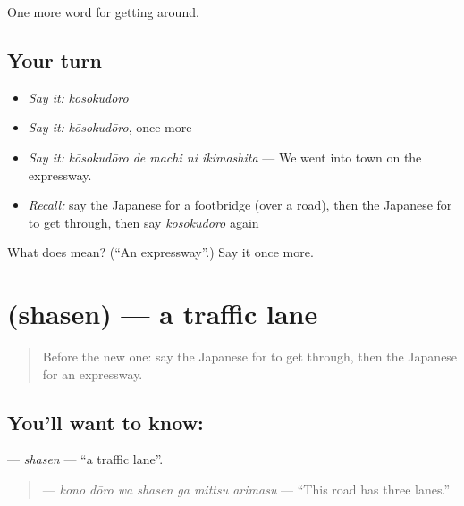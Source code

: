 \begin{grammarlens}[title={What you've built}]
One more word for getting around.
\end{grammarlens}

\subsection*{Your turn}
\begin{itemize}
\raggedright
  \item \emph{Say it:} \emph{kōsokudōro}
  \item \emph{Say it:} \emph{kōsokudōro}, once more
  \item \emph{Say it:} \emph{kōsokudōro de machi ni ikimashita} — We went into town on the expressway.
  \item \emph{Recall:} say the Japanese for a footbridge (over a road), then the Japanese for to get through, then say \emph{kōsokudōro} again
\end{itemize}

\begin{tcolorbox}[breakable,colback=teal!4,colframe=teal!35!black,title={Before you move on}]
What does  mean? (\textquotedblleft{}An expressway\textquotedblright{}.) Say it once more.
\end{tcolorbox}
\section[\texorpdfstring{\ja{しゃせん} (shasen)}{しゃせん (shasen)}]{ (shasen) — a traffic lane}

\label{lesson:JA-C390-shasen}



\begin{quote}
Before the new one: say the Japanese for to get through, then the Japanese for an expressway.
\end{quote}

\subsection*{You'll want to know: }
\textbf{} — \emph{shasen} — \textquotedblleft{}a traffic lane\textquotedblright{}.

\begin{quote}
\textbf{    } — \emph{kono dōro wa shasen ga mittsu arimasu} — \textquotedblleft{}This road has three lanes.\textquotedblright{}
\end{quote}

